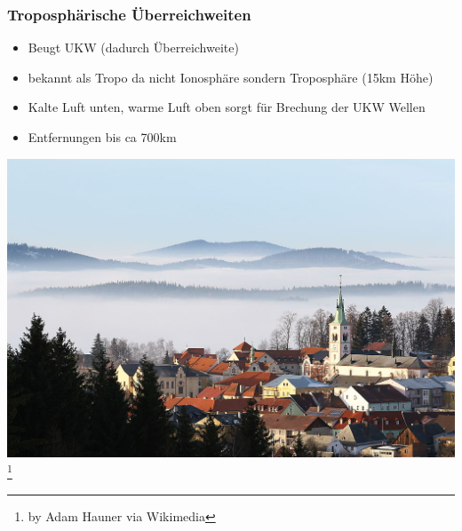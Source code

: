 \begin{frame}
    \frametitle{Troposphärische Überreichweiten}
    \begin{itemize}
      \item Beugt UKW (dadurch Überreichweite)
      \item bekannt als Tropo da nicht Ionosphäre sondern Troposphäre (15km Höhe)
      \item Kalte Luft unten, warme Luft oben sorgt für Brechung der UKW Wellen
      \item Entfernungen bis ca 700km
    \end{itemize}
    	\begin{center}
        \includegraphics[width=.65\textwidth,height=.55\textheight,keepaspectratio]{e09/tropo.jpg}
        \footnote{\tiny by Adam Hauner via Wikimedia}
    \end{center}
\end{frame}


%

